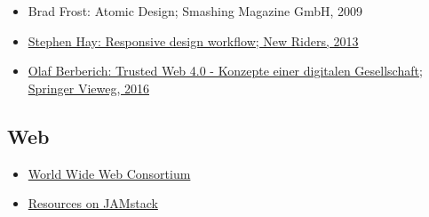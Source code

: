 \begin{itemize}
\tightlist
\item
  Brad Frost: Atomic Design; Smashing Magazine GmbH, 2009
\item
  \href{http://www.digibib.net/permalink/832/FHBK-x/HBZ:HT017780178}{Stephen
  Hay: Responsive design workflow; New Riders, 2013}
\item
  \href{http://www.digibib.net/permalink/832/FHBK-x/HBZ:HT019048164}{Olaf
  Berberich: Trusted Web 4.0 - Konzepte einer digitalen Gesellschaft;
  Springer Vieweg, 2016}
\end{itemize}

\subsection*{Web\label{/mi-2017/modulbeschreibungen-master/MA_WTW_Modul_Web-Technologien}}\label{webpathlabelmi-2017modulbeschreibungen-mastermaux5fwtwux5fmodulux5fweb-technologien}

\begin{itemize}
\tightlist
\item
  \href{https://www.w3.org/}{World Wide Web Consortium}
\item
  \href{https://jamstack.org/resources/}{Resources on JAMstack}
\end{itemize}
